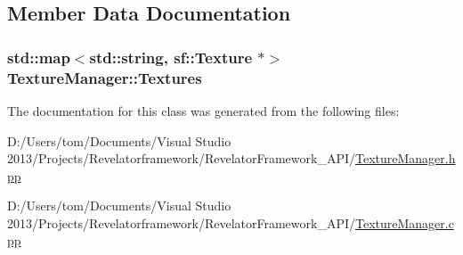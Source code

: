 \subsection{Member Data Documentation}
\hypertarget{class_texture_manager_a7b3ea39ee8017ce3a7b5826bab1d2e04}{
\subsubsection[{Textures}]{\setlength{\rightskip}{0pt plus 5cm}std\-::map$<$std\-::string, sf\-::\-Texture $\ast$$>$ Texture\-Manager\-::\-Textures\hspace{0.3cm}{\ttfamily [private]}}}\label{class_texture_manager_a7b3ea39ee8017ce3a7b5826bab1d2e04}


The documentation for this class was generated from the following files\-:\begin{DoxyCompactItemize}
\item 
D\-:/\-Users/tom/\-Documents/\-Visual Studio 2013/\-Projects/\-Revelatorframework/\-Revelator\-Framework\-\_\-\-A\-P\-I/\hyperlink{_texture_manager_8hpp}{Texture\-Manager.\-hpp}\item 
D\-:/\-Users/tom/\-Documents/\-Visual Studio 2013/\-Projects/\-Revelatorframework/\-Revelator\-Framework\-\_\-\-A\-P\-I/\hyperlink{_texture_manager_8cpp}{Texture\-Manager.\-cpp}\end{DoxyCompactItemize}
